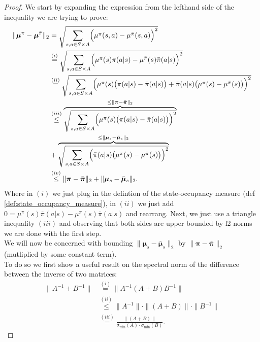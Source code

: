 \begin{proof}
    We start by expanding the expression from the lefthand side of the inequality we are trying to prove: 
    \begin{align*}
        \| \bm{\mu}^{\pi} - \bm{\mu}^{\bar{\pi}} \|_2 
        &= \sqrt{
            \sum_{s,a\in S\times A} \Bigl(
                \mu^{\pi} (s,a) - \mu^{\bar{\pi}} (s,a)
            \Bigr)^2
        } \\
        & \stackrel{(i)}{=}  \sqrt{
            \sum_{s,a\in S\times A} \Bigl(
                \mu^{\pi} (s) \pi(a|s) - \mu^{\bar{\pi}} (s) \bar{\pi}(a|s)
            \Bigr)^2
        } \\
        & \stackrel{(ii)}{=}  \sqrt{
            \sum_{s,a\in S\times A} \Bigl(
                \mu^{\pi} (s) \big( \pi(a|s) - \bar{\pi}(a|s) \big)
                + \bar{\pi}(a|s) \big( \mu^{\pi} (s) - \mu^{\bar{\pi}} (s)  \big)
            \Bigr)^2
        } \\
        & \stackrel{(iii)}{\leq}  \overbrace{\sqrt{
            \sum_{s,a\in S\times A} \Bigl(
                \mu^{\pi} (s) \big( \pi(a|s) - \bar{\pi}(a|s) \big)
            \Bigr)^2
        } }^{\leq  \| \bm{\pi} - \bar{\bm{\pi}} \|_2 } \\&
        + \overbrace{ \sqrt{
            \sum_{s,a\in S\times A} \Bigl(
                \bar{\pi}(a|s) 
                \big( \mu^{\pi} (s) - \mu^{\bar{\pi}} (s)  \big)
            \Bigr)^2
        } }^{\leq \| \bm{\mu}_s - \bar{\bm{\mu}}_s \|_2}\\
        & \stackrel{(iv)}{\leq} 
        \| \bm{\pi} - \bar{\bm{\pi}} \|_2 +
         \| \bm{\mu}_s - \bar{\bm{\mu}}_s \|_2.
    \end{align*}
    Where in $(i)$ we just plug in the defintion of the state-occupancy measure (def \ref{def:state_occupancy_measure}), in $(ii)$ we just add $0 = \mu^{\pi}(s)\bar{\pi}(a|s) - \mu^{\pi}(s)\bar{\pi}(a|s)$ and rearrang. Next, we just use a triangle inequality $(iii)$ and observing that both sides are upper bounded by l2 norms we are done with the first step. \\

    We will now be concerned with bounding $\| \bm{\mu}_s - \bar{\bm{\mu}}_s \|_2$ by $\| \bm{\pi} - \bar{\bm{\pi}} \|_2$ (mutliplied by some constant term). \\

    To do so we first show a useful result on the spectral norm of the difference between the inverse of two matrices:
    \begin{align*}
        \|A^{-1} + B^{-1}\| 
        & \stackrel{(i)}{=} 
        \| A^{-1} (A+B) B^{-1} \| \\ 
        & \stackrel{(ii)}{\leq}  
        \| A^{-1} \| \cdot \| (A+B) \| \cdot \| B^{-1} \| \\
        & \stackrel{(iii)}{=}  
        \frac{\| (A+B) \|}{\sigma_\text{min}(A)\cdot \sigma_\text{min}(B)}. \tag{l}
    \end{align*}


\end{proof}
